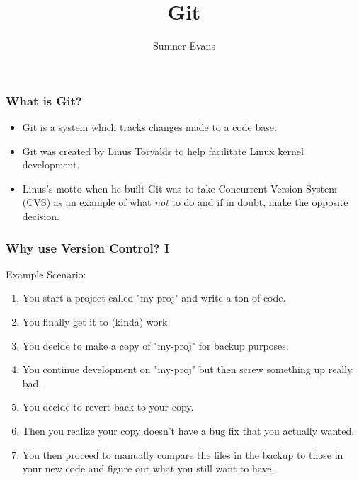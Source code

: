 \documentclass{lug}
\title{Git}
\author{Sumner Evans}
\begin{document}
\begin{frame}
    \frametitle{What is Git?}

    \begin{itemize}[<+->]
        \item Git is a system which tracks changes made to a code base.
        \item Git was created by Linus Torvalds to help facilitate Linux kernel development.
        \item Linus's motto when he built Git was to take Concurrent Version System (CVS) as an
            example of what \textit{not} to do and if in doubt, make the opposite decision.
            \footnotemark
    \end{itemize}

\end{frame}

\begin{frame}
    \frametitle{Why use Version Control? I}

    Example Scenario:

    \begin{enumerate}[<+->]
        \item You start a project called "my-proj" and write a ton of code.
        \item You finally get it to (kinda) work.
        \item You decide to make a copy of "my-proj" for backup purposes.
        \item You continue development on "my-proj" but then screw something up really bad.
        \item You decide to revert back to your copy.
        \item Then you realize your copy doesn't have a bug fix that you actually wanted.
        \item You then proceed to manually compare the files in the backup to those in your new code
            and figure out what you still want to have.
    \end{enumerate}

\end{frame}
\end{document}
